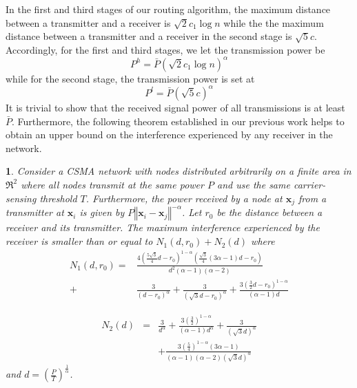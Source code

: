 \documentclass[english]{IEEEtran}
\theoremstyle{plain}
\newtheorem{thm}{\protect\theoremname}
\theoremstyle{plain}
\theoremstyle{plain}
\theoremstyle{remark}
\providecommand{\theoremname}{Theorem}
\begin{document}
In the first and third stages of our routing algorithm, the maximum
distance between a transmitter and a receiver is $\sqrt{2}c_{1}\log n$
while the the maximum distance between a transmitter and a receiver
in the second stage is $\sqrt{5}c$. Accordingly, for the first and
third stages, we let the transmission power be
\begin{equation}
P^{h}=\bar{P}\left(\sqrt{2}c_{1}\log n\right)^{\alpha}\label{eq:high transmit power}
\end{equation}
while for the second stage, the transmission power is set at 
\begin{equation}
P^{l}=\bar{P}\left(\sqrt{5}c\right)^{\alpha}\label{eq:low transmit power}
\end{equation}
It is trivial to show that the received signal power of all transmissions
is at least $\bar{P}$. Furthermore, the following theorem established
in our previous work \cite[Theorem 1]{Yang12Connectivity} helps to
obtain an upper bound on the interference experienced by any receiver
in the network.
\begin{thm}
\label{thm:interference homogeneous CSMA}Consider a CSMA network
with nodes distributed arbitrarily on a finite area in $\Re^{2}$
where all nodes transmit at the same power $P$ and use the same carrier-sensing
threshold $T$. Furthermore, the power received by a node at $\boldsymbol{x}_{j}$
from a transmitter at $\boldsymbol{x}_{i}$ is given by $P\left\Vert \boldsymbol{x}_{i}-\boldsymbol{x}_{j}\right\Vert ^{-\alpha}$.
Let $r_{0}$ be the distance between a receiver and its transmitter.
The maximum interference experienced by the receiver is smaller than
or equal to $N_{1}\left(d,r_{0}\right)+N_{2}\left(d\right)$ where
\begin{align}
N_{1}\left(d,r_{0}\right)= & \frac{4\left(\frac{5\sqrt{3}}{4}d-r_{0}\right)^{1-\alpha}\left(\frac{\sqrt{3}}{4}\left(3\alpha-1\right)d-r_{0}\right)}{d^{2}\left(\alpha-1\right)\left(\alpha-2\right)}\nonumber \\
+ & \frac{3}{\left(d-r_{0}\right)^{\alpha}}+\frac{3}{\left(\sqrt{3}d-r_{0}\right)^{\alpha}}+\frac{3\left(\frac{3}{2}d-r_{0}\right)^{1-\alpha}}{\left(\alpha-1\right)d}\label{eq:N_1}
\end{align}


\begin{eqnarray}
N_{2}\left(d\right) & = & \frac{3}{d^{\alpha}}+\frac{3(\frac{3}{2})^{1-\alpha}}{\left(\alpha-1\right)d^{\alpha}}+\frac{3}{\left(\sqrt{3}d\right)^{\alpha}}\nonumber \\
 &  & +\frac{3\left(\frac{5}{4}\right)^{1-\alpha}\left(3\alpha-1\right)}{\left(\alpha-1\right)\left(\alpha-2\right)\left(\sqrt{3}d\right)^{\alpha}}\label{eq:N_2}
\end{eqnarray}
and $d=\left(\frac{P}{T}\right)^{\frac{1}{\alpha}}$.
\end{thm}
\end{document}
